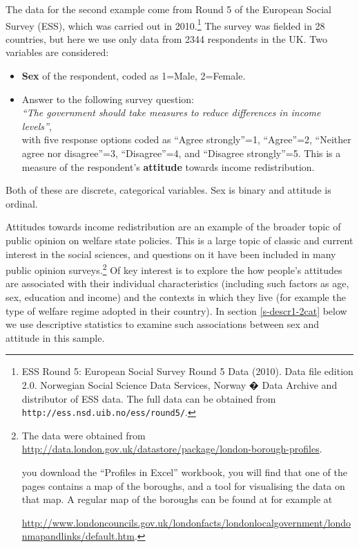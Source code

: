 \documentclass[11pt,a4paper,openany]{book}
\let\rmarkdownfootnote\footnote%
\def\footnote{\protect\rmarkdownfootnote}
\begin{document}
The data for the second example come from Round 5 of the European Social
Survey (ESS), which was carried out in 2010.\footnote{ESS Round 5:
  European Social Survey Round 5 Data (2010). Data file edition 2.0.
  Norwegian Social Science Data Services, Norway � Data Archive and
  distributor of ESS data. The full data can be obtained from
  \texttt{http://ess.nsd.uib.no/ess/round5/}.} The survey was fielded in
28 countries, but here we use only data from 2344 respondents in the UK.
Two variables are considered:

\begin{itemize}
\item
  \textbf{Sex} of the respondent, coded as 1=Male, 2=Female.
\item
  Answer to the following survey question:\\
  \emph{``The government should take measures to reduce differences in
  income levels''},\\
  with five response options coded as ``Agree strongly''=1, ``Agree''=2,
  ``Neither agree nor disagree''=3, ``Disagree''=4, and ``Disagree
  strongly''=5. This is a measure of the respondent's \textbf{attitude}
  towards income redistribution.
\end{itemize}

Both of these are discrete, categorical variables. Sex is binary and
attitude is ordinal.

Attitudes towards income redistribution are an example of the broader
topic of public opinion on welfare state policies. This is a large topic
of classic and current interest in the social sciences, and questions on
it have been included in many public opinion surveys.\footnote{The data
  were obtained from
  \url{http://data.london.gov.uk/datastore/package/london-borough-profiles}.

  \noindentIf you download the ``Profiles in Excel'' workbook, you will
  find that one of the pages contains a map of the boroughs, and a tool
  for visualising the data on that map. A regular map of the boroughs
  can be found at for example at

  \url{http://www.londoncouncils.gov.uk/londonfacts/londonlocalgovernment/londonmapandlinks/default.htm}.}
Of key interest is to explore the how people's attitudes are associated
with their individual characteristics (including such factors as age,
sex, education and income) and the contexts in which they live (for
example the type of welfare regime adopted in their country). In section
\ref{s-descr1-2cat} below we use descriptive statistics to examine such
associations between sex and attitude in this sample.
\end{document}
